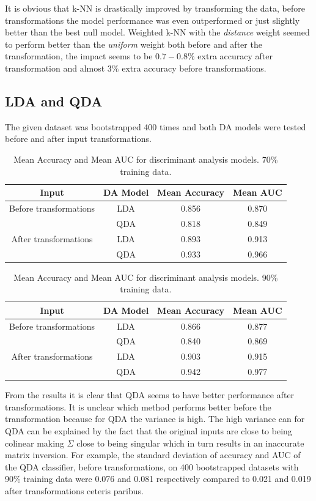 \documentclass{article}
\begin{document}
It is obvious that k-NN is drastically improved by transforming the data, before transformations the model performance was even outperformed or just slightly better than the best null model. Weighted k-NN with the \textit{distance} weight seemed to perform better than the \textit{uniform} weight both before and after the transformation, the impact seems to be $0.7-0.8\%$ extra accuracy after transformation and almost $3\%$ extra accuracy before transformations. 

\subsection{LDA and QDA}
The given dataset was bootstrapped 400 times and both DA models were tested before and after input transformations.
\begin{table}[h!]
	\centering
	\begin{tabular}{cccc}
		Input & DA Model & Mean Accuracy & Mean AUC \\
		\midrule
		Before transformations
		& LDA & 0.856 & 0.870 \\
	    & QDA & 0.818 & 0.849 \\
		\midrule
		After transformations
		& LDA & 0.893 & 0.913 \\
		& QDA & 0.933 & 0.966 \\
	\end{tabular}
	\caption{Mean Accuracy and Mean AUC for discriminant analysis models. 70\% training data.}
	\label{tab:logreg_table_70}
\end{table}
\begin{table}[h!]
	\centering
	\begin{tabular}{cccc}
		Input & DA Model & Mean Accuracy & Mean AUC \\
		\midrule
		Before transformations
		& LDA & 0.866 & 0.877 \\
	    & QDA & 0.840 & 0.869 \\
		\midrule
		After transformations
		& LDA & 0.903 & 0.915 \\
		& QDA & 0.942 & 0.977 \\
	\end{tabular}
	\caption{Mean Accuracy and Mean AUC for discriminant analysis models. 90\% training data.}
	\label{tab:logreg_table_70}
\end{table}
From the results it is clear that QDA seems to have better performance after transformations. It is unclear which method performs better before the transformation because for QDA the variance is high. The high variance can for QDA can be explained by the fact that the original inputs are close to being colinear making $\Sigma$ close to being singular which in turn results in an inaccurate matrix inversion. For example, the standard deviation of accuracy and AUC of the QDA classifier, before transformations, on 400 bootstrapped datasets with 90\% training data were 0.076 and 0.081 respectively compared to 0.021 and 0.019 after transformations ceteris paribus.
\end{document}
